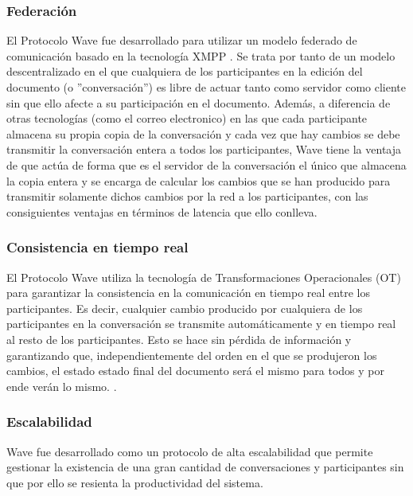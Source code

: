     \subsubsection{Federación}\label{sssec:federation}
    
    El Protocolo Wave \cite{ref:wave_over_xmpp} fue desarrollado para utilizar un modelo federado \cite{ref:wave_federation} \cite{ref:wave_white_paper} de comunicación basado en la tecnología XMPP \cite{ref:xmpp} \cite{ref:wave_over_xmpp}. Se trata por tanto de un modelo descentralizado en el que cualquiera de los participantes en la edición del documento (o ''conversación'') es libre de actuar tanto como servidor como cliente sin que ello afecte a su participación en el documento. 
    Además, a diferencia de otras tecnologías (como el correo electronico) en las que cada participante almacena su propia copia de la conversación y cada vez que hay cambios se debe transmitir la conversación entera a todos los participantes, Wave tiene la ventaja de que actúa de forma que es el servidor de la conversación el único que almacena la copia entera y se encarga de calcular los cambios que se han producido para transmitir solamente dichos cambios por la red a los participantes, con las consiguientes ventajas en términos de latencia que ello conlleva. 

    \subsubsection{Consistencia en tiempo real}\label{sssec:realTime}
    
    El Protocolo Wave \cite{ref:wave_over_xmpp} utiliza la tecnología de Transformaciones Operacionales (OT) \cite{ref:how_ot_works} para garantizar la consistencia en la comunicación en tiempo real entre los participantes. Es decir, cualquier cambio producido por cualquiera de los participantes en la conversación se transmite automáticamente y en tiempo real al resto de los participantes. Esto se hace sin pérdida de información y garantizando que, independientemente del orden en el que se produjeron los cambios, el estado estado final del documento será el mismo para todos y por ende verán lo mismo. \cite{ref:wave_ot}.
    
    \subsubsection{Escalabilidad}
    
    Wave fue desarrollado como un protocolo de alta escalabilidad que permite gestionar la existencia de una gran cantidad de conversaciones y participantes sin que por ello se resienta la productividad del sistema.
    
